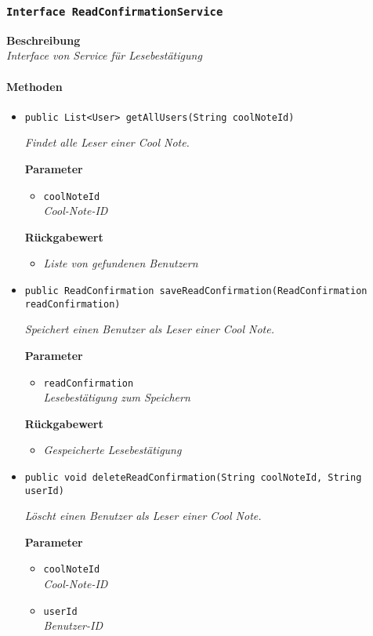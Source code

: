      \subsubsection{\texttt{Interface ReadConfirmationService}}
     \textbf{Beschreibung} \\
     \textit{Interface von Service für Lesebestätigung}
     \paragraph*{Methoden}
     \begin{itemize}
     	\item{\texttt{public List<User> getAllUsers(String coolNoteId)}}
     	
     	\textit{Findet alle Leser einer Cool Note.}
     	
     	\textbf{Parameter}
     	\begin{itemize}
     		\item\texttt{coolNoteId}\\
     		\textit{Cool-Note-ID}
     	\end{itemize}
     	
     	\textbf{Rückgabewert}
     	\begin{itemize}
     		\item\textit{Liste von gefundenen Benutzern}
     	\end{itemize}
     
     \item{\texttt{public ReadConfirmation saveReadConfirmation(ReadConfirmation readConfirmation)}}
     	
     	\textit{Speichert einen Benutzer als Leser einer Cool Note.}
     	
     	\textbf{Parameter}
     	\begin{itemize}
     		\item\texttt{readConfirmation}\\
     		\textit{Lesebestätigung zum Speichern}
     	\end{itemize}
     	
     	\textbf{Rückgabewert}
     	\begin{itemize}
     		\item\textit{Gespeicherte Lesebestätigung}
     	\end{itemize}
     
     \item{\texttt{public void deleteReadConfirmation(String coolNoteId, String userId)}}
     	
     	\textit{Löscht einen Benutzer als Leser einer Cool Note.}
     	
     	\textbf{Parameter}
     	\begin{itemize}
     		\item\texttt{coolNoteId}\\
     		\textit{Cool-Note-ID}
     		\item\texttt{userId}\\
     		\textit{Benutzer-ID}
     	\end{itemize}
     \end{itemize}
 
